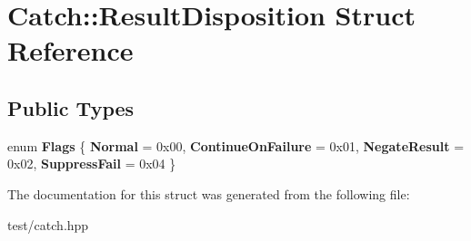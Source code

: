 \hypertarget{structCatch_1_1ResultDisposition}{}\section{Catch\+:\+:Result\+Disposition Struct Reference}
\label{structCatch_1_1ResultDisposition}
\subsection*{Public Types}
\begin{DoxyCompactItemize}
\item 
enum {\bfseries Flags} \{ {\bfseries Normal} = 0x00, 
{\bfseries Continue\+On\+Failure} = 0x01, 
{\bfseries Negate\+Result} = 0x02, 
{\bfseries Suppress\+Fail} = 0x04
 \}\hypertarget{structCatch_1_1ResultDisposition_a3396cad6e2259af326b3aae93e23e9d8}{}\label{structCatch_1_1ResultDisposition_a3396cad6e2259af326b3aae93e23e9d8}

\end{DoxyCompactItemize}


The documentation for this struct was generated from the following file\+:\begin{DoxyCompactItemize}
\item 
test/catch.\+hpp\end{DoxyCompactItemize}
